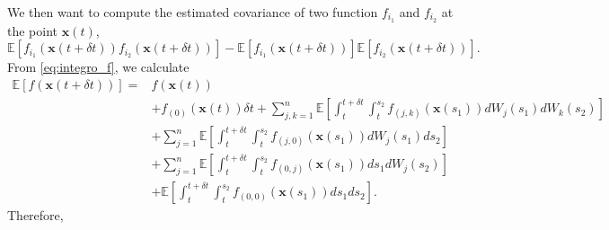 We then want to compute the estimated covariance of two function $f_{i_1}$ and $f_{i_2}$ at the point $\mathbf{x}(t)$, 
%
\begin{equation}
\mathbb{E}[f_{i_1}(\mathbf{x}(t + \delta t))f_{i_2}(\mathbf{x}(t + \delta t))] - \mathbb{E}[f_{i_1}(\mathbf{x}(t + \delta t))]\mathbb{E}[f_{i_2}(\mathbf{x}(t + \delta t))].
\end{equation}
%
From \eqref{eq:integro_f}, we calculate
\begin{equation} 
\begin{aligned}
\mathbb{E} [f(\mathbf{x}(t+\delta t))] =&
f(\mathbf{x}(t)) \\
&+  f_{(0)}(\mathbf{x}(t)) \delta t
+ \sum_{j, k=1}^n \mathbb{E} \left[ \int_t^{t+\delta t} \int_t^{s_2} f_{(j,k)}(\mathbf{x}(s_1)) dW_j(s_1) dW_k(s_2) \right] \\
&+ \sum_{j=1}^n \mathbb{E} \left[ \int_t^{t+\delta t} \int_t^{s_2} f_{(j,0)}(\mathbf{x}(s_1)) dW_j(s_1) ds_2  \right]\\
&+ \sum_{j=1}^n \mathbb{E} \left[  \int_t^{t+\delta t} \int_t^{s_2} f_{(0,j)}(\mathbf{x}(s_1)) ds_1 dW_j(s_2) \right] \\
&+ \mathbb{E} \left[ \int_t^{t+\delta t} \int_t^{s_2} f_{(0,0)}(\mathbf{x}(s_1)) ds_1 ds_2  \right].
\end{aligned}
\end{equation}
%
Therefore, 
%
